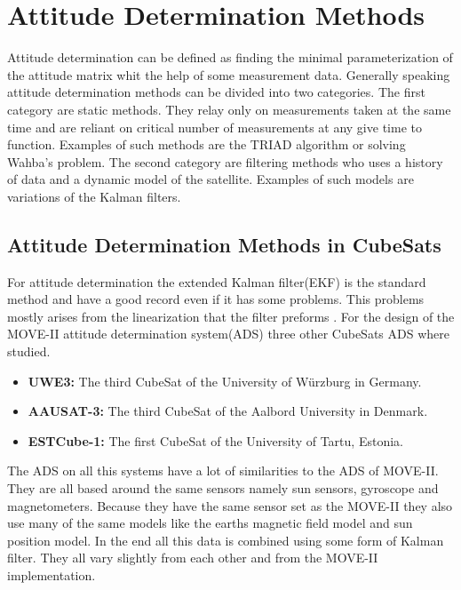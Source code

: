 \chapter{Attitude Determination Methods}\label{chap:EKF}

Attitude determination can be defined as finding the minimal parameterization of the attitude matrix whit the help of some measurement data. Generally speaking attitude determination methods can be divided into two categories. The first category are static methods. They relay only on measurements taken at the same time and are reliant on critical number of measurements at any give time to function. Examples of such methods are the TRIAD algorithm or solving Wahba's problem. The second category are filtering methods who uses a history of data and a dynamic model of the satellite. Examples of such models are variations of the Kalman filters\cite{SADCS}.        

\section{Attitude Determination Methods in CubeSats}
For attitude determination the extended Kalman filter(EKF) is the standard method and have a good record even if it has some problems. This problems mostly arises from the linearization that the filter preforms \cite{attdetSur}. For the design of the MOVE-II attitude determination system(ADS) three other CubeSats ADS where studied\cite{DavidThesis}. 

\begin{itemize}
  \item \textbf{UWE3:} The third CubeSat of the University of Würzburg in Germany\cite{UWE-3}.
  \item \textbf{AAUSAT-3:} The third CubeSat of the Aalbord University in Denmark\cite{aausat}. 
  \item \textbf{ESTCube-1:} The first CubeSat of the University of Tartu, Estonia\cite{EST}.
\end{itemize}       

The ADS on all this systems have a lot of similarities to the ADS of MOVE-II. They are all based around the same sensors namely sun sensors, gyroscope and magnetometers. Because they have the same sensor set as the MOVE-II they also use many of the same models like the earths magnetic field model and sun position model. In the end all this data is combined using some form of Kalman filter. They all vary slightly from each other and from the MOVE-II implementation. 

